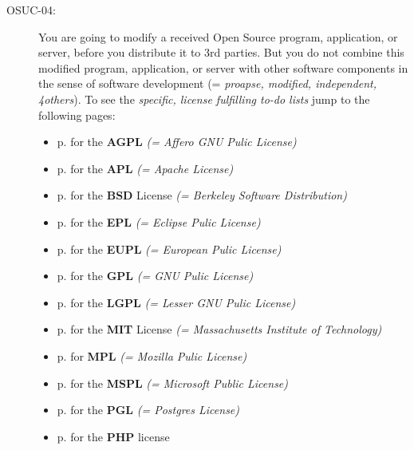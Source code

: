 \begin{description}
\item[OSUC-04:]\label{OSUC-04-DEF} You are going to modify a received Open
Source program, application, or server, before you distribute it to 3rd parties.
But you do not combine this modified program, application, or server with other
software components in the sense of software development (= \textit{proapse,
modified, independent, 4others}).
To see the \textit{specific, license fulfilling to-do lists} jump to the
following pages:
  \begin{itemize}
    \item p. \pageref{OSUC-04-AGPL} for the \textbf{AGPL}
      \textit{(= Affero GNU Pulic License)} 
    \item p. \pageref{OSUC-04-Apache20} for the \textbf{APL}
      \textit{(= Apache License)}
    \item p. \pageref{OSUC-04-BSD} for the \textbf{BSD} License
      \textit{(= Berkeley Software Distribution)}
    \item p. \pageref{OSUC-04-EPL} for the \textbf{EPL}
      \textit{(= Eclipse Pulic License)}     
    \item p. \pageref{OSUC-04-EUPL} for the \textbf{EUPL}
      \textit{(= European Pulic License)} 
    \item p. \pageref{OSUC-04-GPL} for the \textbf{GPL}
       \textit{(= GNU Pulic License)} 
    \item p. \pageref{OSUC-04-LGPL} for the \textbf{LGPL}
      \textit{(= Lesser GNU Pulic License)}           
    \item p. \pageref{OSUC-04-MIT} for the \textbf{MIT} License
       \textit{(= Massachusetts Institute of Technology)} 
    \item p. \pageref{OSUC-04-MPL} for \textbf{MPL}
      \textit{(= Mozilla Pulic License)}     
    \item p. \pageref{OSUC-04-MsPL} for the \textbf{MSPL}
      \textit{(= Microsoft Public License)} 
    \item p. \pageref{OSUC-04-PGL} for the \textbf{PGL}
      \textit{(= Postgres License)} 
    \item p. \pageref{OSUC-04-PHP} for the \textbf{PHP} license 
  \end{itemize}


\end{description}
